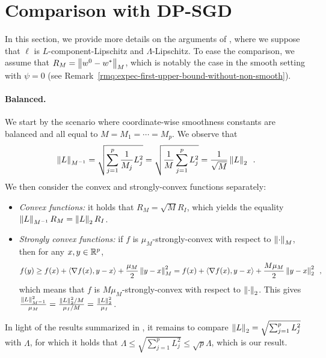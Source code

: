 
\section{Comparison with DP-SGD}
\label{sec-app:comparison-with-dp}

In this section, we provide more details on the arguments of
, where we suppose that $\ell$ is $L$-component-Lipschitz
and $\Lambda$-Lipschitz.
To ease the comparison, we assume that $R_M = \left \lVert w^0 - w^* \right \rVert_M$, which is
notably the case in the smooth setting with $\psi = 0$
(see Remark~\ref{rmq:expec-first-upper-bound-without-non-smooth}).

\paragraph{Balanced.}
We start by the scenario where coordinate-wise smoothness constants are balanced
and all equal to $M = M_1 = \cdots = M_p$.
We observe that
\begin{align}
  \left \lVert L \right \rVert_{M^{-1}}
  = \sqrt{\sum_{j=1}^p \frac{1}{M_j} L_j^2}
  = \sqrt{\frac{1}{M} \sum_{j=1}^p L_j^2}
  = \frac{1}{\sqrt{M}} \left \lVert L \right \rVert_2\enspace.
\end{align}
We then consider the convex and strongly-convex functions separately:
\begin{itemize}
  \item \textit{Convex functions:}
        it holds that $R_M = \sqrt{M} R_I$, which yields the equality
        $\left \lVert L \right \rVert_{M^{-1}} R_{M} = \left \lVert L \right \rVert_2 R_I$.
  \item \textit{Strongly convex functions:}
        if $f$ is $\mu_M$-strongly-convex with respect to $\left \lVert \cdot \right \rVert_M$, then for
        any $x, y \in \mathbb R^p$,
        \begin{align}
          f(y)
          \ge f(x) + \left\langle \nabla f(x), y - x \right\rangle + \frac{\mu_M}{2} \left \lVert y - x \right \rVert_M^2
          = f(x) + \left\langle \nabla f(x), y - x \right\rangle + \frac{M\mu_M}{2} \left \lVert y - x \right \rVert^2_2\enspace,
        \end{align}
        which means that $f$ is $M\mu_M$-strongly-convex with respect to $\left \lVert \cdot \right \rVert_2$.
        This gives
        $\frac{\left \lVert L \right \rVert_{M^{-1}}^2}{\mu_M}
          = \frac{\left \lVert L \right \rVert_2^2 / M}{\mu_I / M}
          = \frac{\left \lVert L \right \rVert_2^2}{\mu_I}$.
\end{itemize}

In light of the results summarized in , it remains to
compare $\left \lVert L \right \rVert_2 = \sqrt{\sum_{j=1}^p L_j^2}$ with $\Lambda$, for which it
holds that $\Lambda \le \sqrt{\sum_{j=1}^p L_j^2} \le \sqrt{p}\Lambda$, which is
our result.

